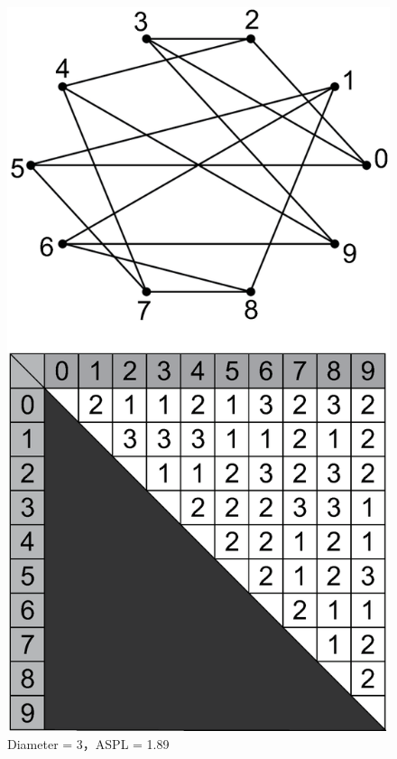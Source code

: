 \documentclass[graybox]{svmult}
\begin{document}
\begin{figure}[t]
 \begin{minipage}{0.5\hsize}
  \begin{center}
\includegraphics[scale=0.25,clip]{img/n10d3-random.eps}
\caption{Diameter = 3，ASPL = 1.89}\label{fig:example-random}
  \end{center}
 \end{minipage}

\end{figure}
\end{document}

